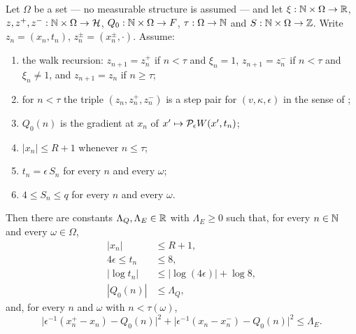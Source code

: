 \begin{lemma}
Let $\Omega$ be a set --- no measurable structure is assumed --- and let
$\xi:\mathbb{N}\times\Omega\to\mathbb{R}$, $z,z^+,z^-:\mathbb{N}\times\Omega\to\mathcal H$,
$Q_0:\mathbb{N}\times\Omega\to F$, $\tau:\Omega\to\mathbb{N}$ and $S:\mathbb{N}\times\Omega\to\mathbb{Z}$.
Write $z_n=(x_n,t_n)$, $z^\pm_n=(x^\pm_n,\cdot)$. Assume:
\begin{enumerate}
\item\label{it:wpb-rec} the walk recursion: $z_{n+1}=z^+_n$ if $n<\tau$ and
$\xi_n=1$, $z_{n+1}=z^-_n$ if $n<\tau$ and $\xi_n\ne1$, and $z_{n+1}=z_n$ if
$n\ge\tau$;
\item\label{it:wpb-pair} for $n<\tau$ the triple $(z_n,z^+_n,z^-_n)$ is a step
pair for $(v,\kappa,\epsilon)$ in the sense of ;
\item\label{it:wpb-grad} $Q_0(n)$ is the gradient at $x_n$ of
$x'\mapsto\mathcal{P}_\epsilon W(x',t_n)$;
\item\label{it:wpb-xbnd} $|x_n|\le R+1$ whenever $n\le\tau$;
\item\label{it:wpb-lat} $t_n=\epsilon\,S_n$ for every $n$ and every $\omega$;
\item\label{it:wpb-range} $4\le S_n\le q$ for every $n$ and every $\omega$.
\end{enumerate}
Then there are constants $\Lambda_Q,\Lambda_E\in\mathbb{R}$ with $\Lambda_E\ge0$ such
that, for every $n\in\mathbb{N}$ and every $\omega\in\Omega$,
\begin{align}
  |x_n|&\le R+1, \label{eq:wpb-x}\\
  4\epsilon\le t_n&\le 8, \label{eq:wpb-t}\\
  \bigl|\log t_n\bigr|&\le\bigl|\log(4\epsilon)\bigr|+\log 8,
    \label{eq:wpb-logt}\\
  |Q_0(n)|&\le\Lambda_Q, \label{eq:wpb-Q}
\end{align}
and, for every $n$ and $\omega$ with $n<\tau(\omega)$,
\begin{equation}\label{eq:wpb-E}
  \bigl|\epsilon^{-1}(x^+_n-x_n)-Q_0(n)\bigr|^2
    +\bigl|\epsilon^{-1}(x_n-x^-_n)-Q_0(n)\bigr|^2\le\Lambda_E .
\end{equation}
\end{lemma}
